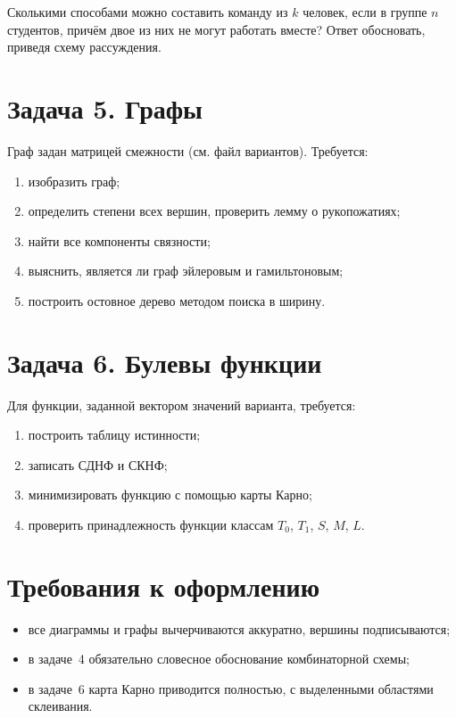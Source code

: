 \documentclass[12pt, a4paper]{article}
\begin{document}
Сколькими способами можно составить команду из $k$ человек, если в группе
$n$ студентов, причём двое из них не могут работать вместе?
Ответ обосновать, приведя схему рассуждения.

\section*{Задача 5. Графы}

Граф задан матрицей смежности (см. файл вариантов). Требуется:
\begin{enumerate}[label=\arabic*)]
  \item изобразить граф;
  \item определить степени всех вершин, проверить лемму о рукопожатиях;
  \item найти все компоненты связности;
  \item выяснить, является ли граф эйлеровым и гамильтоновым;
  \item построить остовное дерево методом поиска в ширину.
\end{enumerate}

\section*{Задача 6. Булевы функции}

Для функции, заданной вектором значений варианта, требуется:
\begin{enumerate}[label=\arabic*)]
  \item построить таблицу истинности;
  \item записать СДНФ и СКНФ;
  \item минимизировать функцию с помощью карты Карно;
  \item проверить принадлежность функции классам
        $T_0$, $T_1$, $S$, $M$, $L$.
\end{enumerate}

\vspace{1.2em}

\section*{Требования к оформлению}

\begin{itemize}[nosep]
  \item все диаграммы и графы вычерчиваются аккуратно, вершины подписываются;
  \item в задаче~4 обязательно словесное обоснование комбинаторной схемы;
  \item в задаче~6 карта Карно приводится полностью, с выделенными областями склеивания.
\end{itemize}
\end{document}
